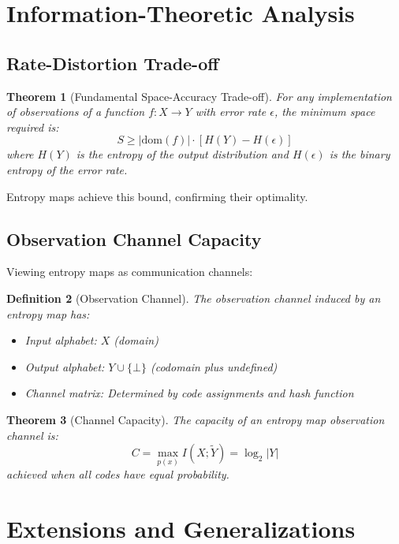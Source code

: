 \documentclass[11pt,final,hidelinks]{article}
\newtheorem{theorem}{Theorem}[section]
\newtheorem{definition}[theorem]{Definition}
\newcommand{\obs}[1]{\widetilde{#1}}  %
\newcommand{\Card}[1]{\lvert#1\rvert}
\newcommand{\error}{\epsilon}
\begin{document}
\section{Information-Theoretic Analysis}

\subsection{Rate-Distortion Trade-off}

\begin{theorem}[Fundamental Space-Accuracy Trade-off]
For any implementation of observations of a function $f: X \to Y$ with error rate $\error$, the minimum space required is:
\begin{equation}
S \geq \Card{\text{dom}(f)} \cdot [H(Y) - H(\error)]
\end{equation}
where $H(Y)$ is the entropy of the output distribution and $H(\error)$ is the binary entropy of the error rate.
\end{theorem}

Entropy maps achieve this bound, confirming their optimality.

\subsection{Observation Channel Capacity}

Viewing entropy maps as communication channels:

\begin{definition}[Observation Channel]
The observation channel induced by an entropy map has:
\begin{itemize}
    \item Input alphabet: $X$ (domain)
    \item Output alphabet: $Y \cup \{\bot\}$ (codomain plus undefined)
    \item Channel matrix: Determined by code assignments and hash function
\end{itemize}
\end{definition}

\begin{theorem}[Channel Capacity]
The capacity of an entropy map observation channel is:
\begin{equation}
C = \max_{p(x)} I(X; \obs{Y}) = \log_2 \Card{Y}
\end{equation}
achieved when all codes have equal probability.
\end{theorem}

\section{Extensions and Generalizations}
\end{document}
